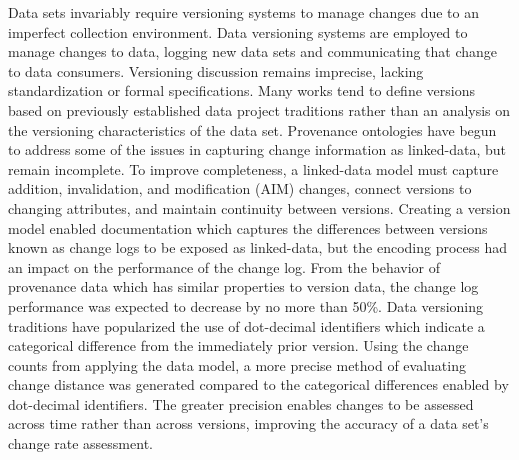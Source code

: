 

Data sets invariably require versioning systems to manage changes due to an imperfect collection environment.
Data versioning systems are employed to manage changes to data, logging new data sets and communicating that change to data consumers.
Versioning discussion remains imprecise, lacking standardization or formal specifications.
Many works tend to define versions based on previously established data project traditions rather than an analysis on the versioning characteristics of the data set.
Provenance ontologies have begun to address some of the issues in capturing change information as linked-data, but remain incomplete.
To improve completeness, a linked-data model must capture addition, invalidation, and modification (AIM) changes, connect versions to changing attributes, and maintain continuity between versions.
Creating a version model enabled documentation which captures the differences between versions known as change logs to be exposed as linked-data, but the encoding process had an impact on the performance of the change log.
From the behavior of provenance data which has similar properties to version data, the change log performance was expected to decrease by no more than 50\%.
Data versioning traditions have popularized the use of dot-decimal identifiers which indicate a categorical difference from the immediately prior version.
Using the change counts from applying the data model, a more precise method of evaluating change distance was generated compared to the categorical differences enabled by dot-decimal identifiers.
The greater precision enables changes to be assessed across time rather than across versions, improving the accuracy of a data set's change rate assessment.

